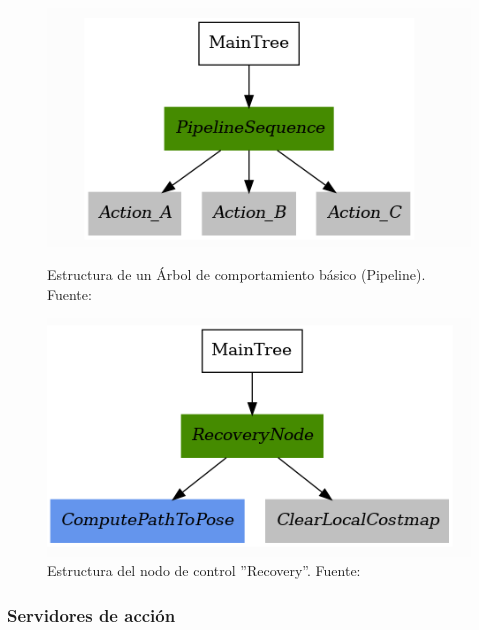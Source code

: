 \begin{figure}[htbp]
  \centering
  \begin{minipage}[b]{0.45\textwidth}
    \centering
    \includegraphics[width=\textwidth]{images/bt_sencillo.png}
    \caption{Estructura de un Árbol de comportamiento básico (Pipeline). Fuente: \cite{nav2}}
    \label{fig:bt_sencillo}
  \end{minipage}
  \hfill
  \begin{minipage}[b]{0.45\textwidth}
    \centering
    \includegraphics[width=\textwidth]{images/recovery_bt.png}
    \caption{Estructura del nodo de control ''Recovery''. Fuente: \cite{nav2}}
    \label{fig:bt_recovery}
  \end{minipage}
\end{figure}

\subsubsection{Servidores de acción}

